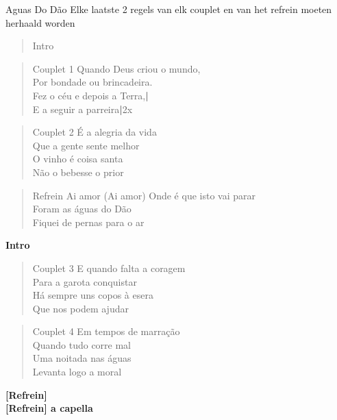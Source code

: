 \begin{song}[huayno]{Aguas Do Dão}
Elke laatste 2 regels van elk couplet en van het refrein moeten herhaald worden\\
\begin{verse}{Intro}

\end{verse}

\begin{verse}{Couplet 1}
Quando Deus criou o mundo,\\ 		         
Por bondade ou brincadeira.\\
Fez o céu e depois a Terra,\hspace{1em}\textbf{|}\chord{|}\\ 
E a seguir a parreira\hspace{3em}\textbf{|}\chord{|}2x\\
\end{verse}

\begin{verse}{Couplet 2}
É a alegria da vida\\ 		        
Que a gente sente melhor\\           
O vinho é coisa santa\\
Não o bebesse o prior\\
\end{verse}

\begin{verse}{Refrein}
Ai amor (Ai amor) Onde é que isto vai parar \\
Foram as águas do Dão\\
Fiquei de pernas para o ar\\ 
\end{verse}

\textbf{Intro}\\

\begin{verse}{Couplet 3}
E quando falta a coragem\\ 
Para a garota conquistar \\
Há sempre uns copos à esera\\ 
Que nos podem ajudar\\
\end{verse}

\begin{verse}{Couplet 4}
Em tempos de marração\\ 
Quando tudo corre mal \\
Uma noitada nas águas \\
Levanta logo a moral \\
\end{verse}

\textbf{[Refrein]}\\
\textbf{[Refrein] a capella}\\

\end{song}

